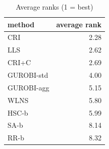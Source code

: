 \begin{table}[htbp]
\centering
\small
\caption{Average ranks (1 = best)}
\label{tab:E4b_equal_budgets_60s_b60_ranks}
\begin{tabular}{lr}
\toprule
method & average rank \\
\midrule
CRI & 2.28 \\
LLS & 2.62 \\
CRI+C & 2.69 \\
GUROBI-std & 4.00 \\
GUROBI-agg & 5.15 \\
WLNS & 5.80 \\
HSC-b & 5.99 \\
SA-b & 8.14 \\
RR-b & 8.32 \\
\bottomrule
\end{tabular}
\end{table}
